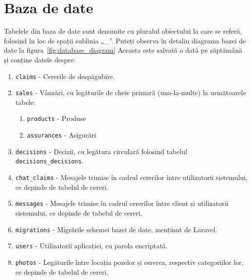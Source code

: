 \section{Baza de date}

	Tabelele din baza de date sunt denumite cu pluralul obiectului la care se referă, folosind în loc de spații sublinia „\_”.
	Puteți observa în detaliu diagrama bazei de date la figura~\ref{fig:database_diagram}
	Aceasta este salvată o dată pe săptămână și conține datele despre:
	\begin{enumerate}
		\item \verb|claims| - Cererile de despăgubire.
		\item \verb|sales| - Vânzări, cu legăturile de cheie primară (una-la-multe) la următoarele tabele:
			\begin{enumerate}
				\item \verb|products| - Produse
				\item \verb|assurances| - Asigurări
			\end{enumerate}
		\item \verb|decisions| - Decizii, cu legătura circulară folosind tabelul \\ \verb|decisions_decisions|.
		\item \verb|chat_claims| - Mesajele trimise în cadrul cererilor între utilizatorii sistemului, ce depinde de tabelul de cereri.
		\item \verb|messages| - Mesajele trimise în cadrul cererilor între client și  utilizatorii sistemului, ce depinde de tabelul de cereri.
		\item \verb|migrations| - Migrările schemei bazei de date, menținut de Laravel.
		\item \verb|users| - Utilizatorii aplicației, cu parola encriptată.
		\item \verb|photos| - Legăturile între locația pozelor și cererea, respectiv categoriilor lor, ce depinde de tabelul de cereri.
	\end{enumerate}

